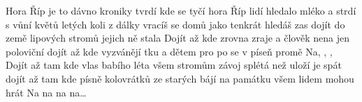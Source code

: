 \begin{TEXT}{Hora Říp}
\REFREN  {} je to dávno kroniky tvrdí \NL
{} kde se tyčí hora Říp \NL
{} lidí hledalo mléko a strdí \NL
{} s vůní květů letých  \NL
{}koli z dálky vracíš se domů \NL
{} jako tenkrát hledáš zas \NL
{} dojít do země lipových stromů \NL
{} jejich ně stala  
\SLOKA Dojít až  kde zrovna zraje  \NL
a člověk nena jen poloviční  \NL
dojít až  kde vyzvánějí tku \NL
a dětem pro po se v píseň promě \NL
Na, , ,   
\SLOKA Dojít až tam kde vlas babího léta \NL
všem stromům závoj splétá než uloží je spát \NL
dojít až tam kde písně kolovrátků \NL
ze starých bájí na památku \NL
všem lidem mohou hrát \NL
Na na na na… \NL
\end{TEXT}
